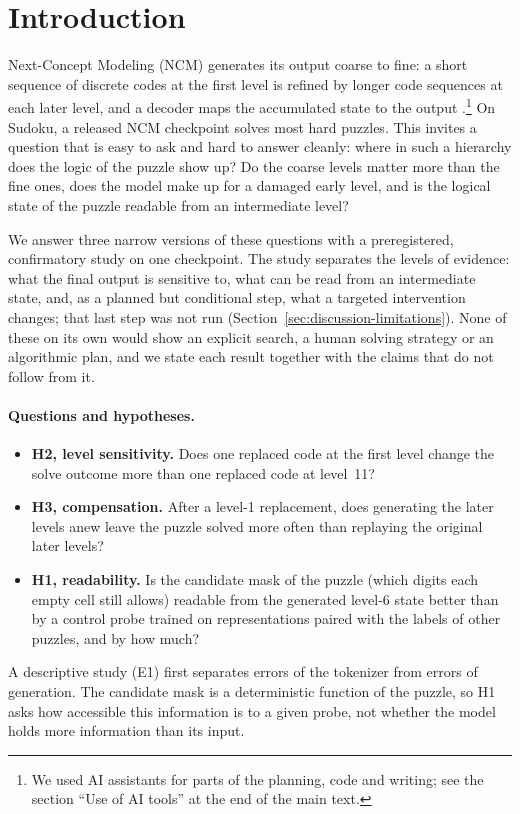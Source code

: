 \section{Introduction}
\label{sec:introduction}

Next-Concept Modeling (NCM) generates its output coarse to fine: a short sequence of discrete codes at the first level is refined by longer code sequences at each later level, and a decoder maps the accumulated state to the output \citep{kumbong2026ncm}.\footnote{We used AI assistants for parts of the planning, code and writing; see the section ``Use of AI tools'' at the end of the main text.} On Sudoku, a released NCM checkpoint solves most hard puzzles. This invites a question that is easy to ask and hard to answer cleanly: where in such a hierarchy does the logic of the puzzle show up? Do the coarse levels matter more than the fine ones, does the model make up for a damaged early level, and is the logical state of the puzzle readable from an intermediate level?

We answer three narrow versions of these questions with a preregistered, confirmatory study on one checkpoint. The study separates the levels of evidence: what the final output is sensitive to, what can be read from an intermediate state, and, as a planned but conditional step, what a targeted intervention changes; that last step was not run (Section~\ref{sec:discussion-limitations}). None of these on its own would show an explicit search, a human solving strategy or an algorithmic plan, and we state each result together with the claims that do not follow from it.

\paragraph{Questions and hypotheses.}
\begin{itemize}
\item \textbf{H2, level sensitivity.} Does one replaced code at the first level change the solve outcome more than one replaced code at level~11?
\item \textbf{H3, compensation.} After a level-1 replacement, does generating the later levels anew leave the puzzle solved more often than replaying the original later levels?
\item \textbf{H1, readability.} Is the candidate mask of the puzzle (which digits each empty cell still allows) readable from the generated level-6 state better than by a control probe trained on representations paired with the labels of other puzzles, and by how much?
\end{itemize}
A descriptive study (E1) first separates errors of the tokenizer from errors of generation. The candidate mask is a deterministic function of the puzzle, so H1 asks how accessible this information is to a given probe, not whether the model holds more information than its input.


